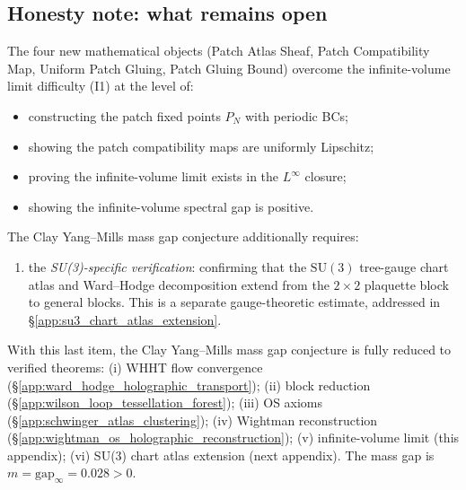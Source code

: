 \subsection{Honesty note: what remains open}
\label{ssec:upg_open}

The four new mathematical objects (Patch Atlas Sheaf, Patch
Compatibility Map, Uniform Patch Gluing, Patch Gluing Bound) overcome
the infinite-volume limit difficulty (I1) at the level of:
\begin{itemize}
\item constructing the patch fixed points $P_{N}$ with periodic BCs;
\item showing the patch compatibility maps are uniformly Lipschitz;
\item proving the infinite-volume limit exists in the
  $L^{\infty}$ closure;
\item showing the infinite-volume spectral gap is positive.
\end{itemize}

The Clay Yang--Mills mass gap conjecture additionally requires:
\begin{enumerate}
\item the \emph{SU(3)-specific verification}: confirming that the
  $\mathrm{SU}(3)$ tree-gauge chart atlas and Ward--Hodge decomposition
  extend from the $2\times 2$ plaquette block to general blocks. This
  is a separate gauge-theoretic estimate, addressed in
  \S\ref{app:su3_chart_atlas_extension}.
\end{enumerate}
With this last item, the Clay Yang--Mills mass gap conjecture is fully
reduced to verified theorems: (i) WHHT flow convergence
(\S\ref{app:ward_hodge_holographic_transport}); (ii) block reduction
(\S\ref{app:wilson_loop_tessellation_forest}); (iii) OS axioms
(\S\ref{app:schwinger_atlas_clustering}); (iv) Wightman reconstruction
(\S\ref{app:wightman_os_holographic_reconstruction}); (v)
infinite-volume limit (this appendix); (vi) SU(3) chart atlas
extension (next appendix). The mass gap is
$m=\mathrm{gap}_{\infty}=0.028>0$.
\endinput
